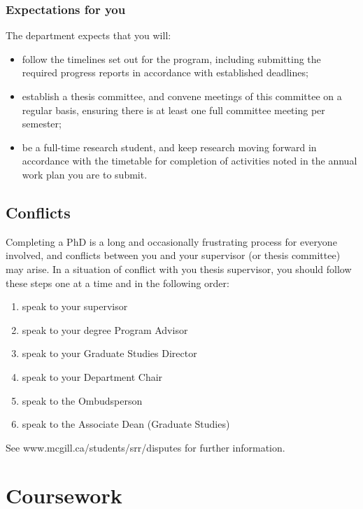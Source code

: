 \documentclass[
]{book}
\providecommand{\tightlist}{%
  \setlength{\itemsep}{0pt}\setlength{\parskip}{0pt}}
\begin{document}
\hypertarget{expectations-for-you}{%
\subsection{Expectations for you}\label{expectations-for-you}}

The department expects that you will:

\begin{itemize}
\tightlist
\item
  follow the timelines set out for the program, including submitting the required progress reports in accordance with established deadlines;
\item
  establish a thesis committee, and convene meetings of this committee on a regular basis, ensuring there is at least one full committee meeting per semester;
\item
  be a full-time research student, and keep research moving forward in accordance with the timetable for completion of activities noted in the annual work plan you are to submit.
\end{itemize}

\hypertarget{conflicts}{%
\section{Conflicts}\label{conflicts}}

Completing a PhD is a long and occasionally frustrating process for everyone involved, and conflicts between you and your supervisor (or thesis committee) may arise. In a situation of conflict with you thesis supervisor, you should follow these steps one at a time and in the following order:

\begin{enumerate}
\def\labelenumi{\arabic{enumi}.}
\tightlist
\item
  speak to your supervisor
\item
  speak to your degree Program Advisor
\item
  speak to your Graduate Studies Director
\item
  speak to your Department Chair
\item
  speak to the Ombudsperson
\item
  speak to the Associate Dean (Graduate Studies)
\end{enumerate}

See www.mcgill.ca/students/srr/disputes for further information.

\hypertarget{coursework}{%
\chapter{Coursework}\label{coursework}}
\end{document}
